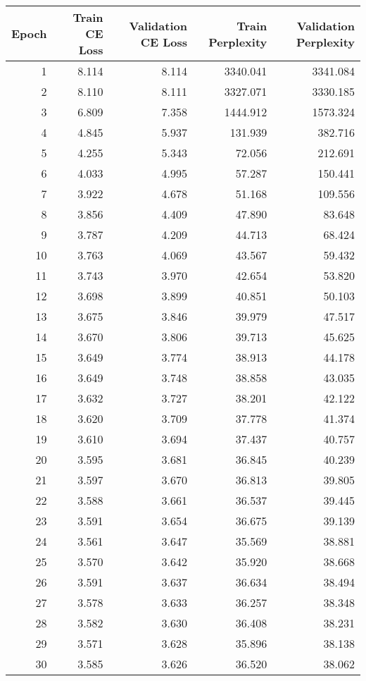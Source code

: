 \begin{tabular}{rrrrr}
\toprule
Epoch & Train CE Loss & Validation CE Loss & Train Perplexity & Validation Perplexity \\
\midrule
1 & 8.114 & 8.114 & 3340.041 & 3341.084 \\
2 & 8.110 & 8.111 & 3327.071 & 3330.185 \\
3 & 6.809 & 7.358 & 1444.912 & 1573.324 \\
4 & 4.845 & 5.937 & 131.939 & 382.716 \\
5 & 4.255 & 5.343 & 72.056 & 212.691 \\
6 & 4.033 & 4.995 & 57.287 & 150.441 \\
7 & 3.922 & 4.678 & 51.168 & 109.556 \\
8 & 3.856 & 4.409 & 47.890 & 83.648 \\
9 & 3.787 & 4.209 & 44.713 & 68.424 \\
10 & 3.763 & 4.069 & 43.567 & 59.432 \\
11 & 3.743 & 3.970 & 42.654 & 53.820 \\
12 & 3.698 & 3.899 & 40.851 & 50.103 \\
13 & 3.675 & 3.846 & 39.979 & 47.517 \\
14 & 3.670 & 3.806 & 39.713 & 45.625 \\
15 & 3.649 & 3.774 & 38.913 & 44.178 \\
16 & 3.649 & 3.748 & 38.858 & 43.035 \\
17 & 3.632 & 3.727 & 38.201 & 42.122 \\
18 & 3.620 & 3.709 & 37.778 & 41.374 \\
19 & 3.610 & 3.694 & 37.437 & 40.757 \\
20 & 3.595 & 3.681 & 36.845 & 40.239 \\
21 & 3.597 & 3.670 & 36.813 & 39.805 \\
22 & 3.588 & 3.661 & 36.537 & 39.445 \\
23 & 3.591 & 3.654 & 36.675 & 39.139 \\
24 & 3.561 & 3.647 & 35.569 & 38.881 \\
25 & 3.570 & 3.642 & 35.920 & 38.668 \\
26 & 3.591 & 3.637 & 36.634 & 38.494 \\
27 & 3.578 & 3.633 & 36.257 & 38.348 \\
28 & 3.582 & 3.630 & 36.408 & 38.231 \\
29 & 3.571 & 3.628 & 35.896 & 38.138 \\
30 & 3.585 & 3.626 & 36.520 & 38.062 \\
\bottomrule
\end{tabular}
